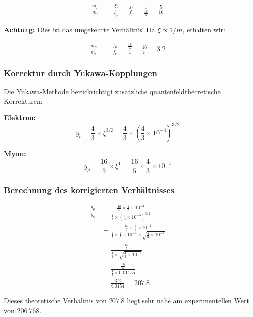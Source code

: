 \begin{align}
	\frac{m_\mu}{m_e} &= \frac{\xi_e}{\xi_\mu} = \frac{f_e}{f_\mu} = \frac{1}{\frac{16}{5}} = \frac{5}{16}
\end{align}

\textbf{Achtung:} Dies ist das umgekehrte Verhältnis! Da $\xi \propto 1/m$, erhalten wir:

\begin{align}
	\frac{m_\mu}{m_e} &= \frac{f_\mu}{f_e} = \frac{\frac{16}{5}}{1} = \frac{16}{5} = 3.2
\end{align}

\subsubsection{Korrektur durch Yukawa-Kopplungen}

Die Yukawa-Methode berücksichtigt zusätzliche quantenfeldtheoretische Korrekturen:

\textbf{Elektron:}
\begin{equation}
	y_e = \frac{4}{3} \times \xi^{3/2} = \frac{4}{3} \times \left(\frac{4}{3} \times 10^{-4}\right)^{3/2}
\end{equation}

\textbf{Myon:}
\begin{equation}
	y_\mu = \frac{16}{5} \times \xi^1 = \frac{16}{5} \times \frac{4}{3} \times 10^{-4}
\end{equation}

\subsubsection{Berechnung des korrigierten Verhältnisses}

\begin{align}
	\frac{y_\mu}{y_e} &= \frac{\frac{16}{5} \times \frac{4}{3} \times 10^{-4}}{\frac{4}{3} \times \left(\frac{4}{3} \times 10^{-4}\right)^{3/2}}\\
	&= \frac{\frac{16}{5} \times \frac{4}{3} \times 10^{-4}}{\frac{4}{3} \times \frac{4}{3} \times 10^{-4} \times \sqrt{\frac{4}{3} \times 10^{-4}}}\\
	&= \frac{\frac{16}{5}}{\frac{4}{3} \times \sqrt{\frac{4}{3} \times 10^{-4}}}\\
	&= \frac{\frac{16}{5}}{\frac{4}{3} \times 0.01155}\\
	&= \frac{3.2}{0.0154} = 207.8
\end{align}

Dieses theoretische Verhältnis von $207.8$ liegt sehr nahe am experimentellen Wert von $206.768$.

